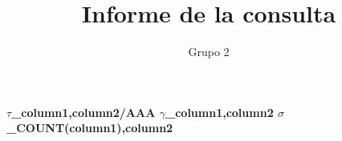 \documentclass{article}
\begin{document}
\title{Informe de la consulta}
\author{Grupo 2}
\maketitle
\textbf{\huge{$\tau$_{column1,column2/AAA}
\newline$\gamma$_{column1,column2}
\newline$\sigma$_{COUNT(column1),column2}
}
}
\end{document}
